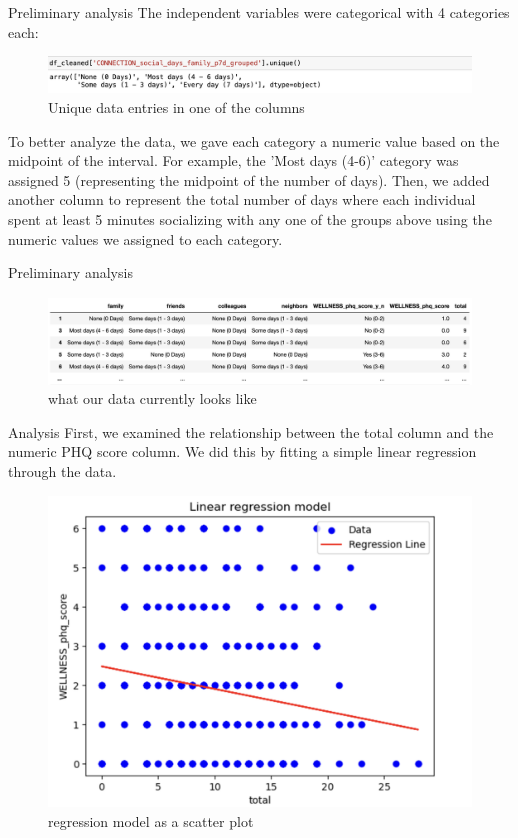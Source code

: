 \documentclass{beamer}
\begin{document}
\begin{frame}{Preliminary analysis}
    The independent variables were categorical with 4 categories each: 
\begin{figure}
    \centering
    \includegraphics[width=1\linewidth]{image2.png}
    \caption{Unique data entries in one of the columns }
    \end{figure}
    To better analyze the data, we gave each category a numeric value based on the midpoint of the interval. For example, the 'Most days (4-6)' category was assigned 5 (representing the midpoint of the number of days). Then, we added another column to represent the total number of days where each individual spent at least 5 minutes socializing with any one of the groups above using the numeric values we assigned to each category. 
\end{frame}

\begin{frame}{Preliminary analysis}
    \begin{figure}
        \centering
        \includegraphics[width=1\linewidth]{image3.png}
        \caption{what our data currently looks like}
        \label{fig:enter-label}
    \end{figure}
\end{frame}

\begin{frame}{Analysis}
    First, we examined the relationship between the total column and the numeric PHQ score column. We did this by fitting a simple linear regression through the data.
    \begin{figure}
        \centering
        \includegraphics[width=0.5\linewidth]{model1.png}
        \caption{regression model as a scatter plot}
        \label{fig:enter-label}
    \end{figure}
\end{frame}
\end{document}
